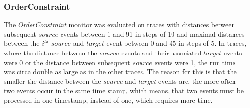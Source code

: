 \subsubsection{OrderConstraint}
The \textit{OrderConstraint} monitor was evaluated on traces with distances between subsequent $source$ events between 1 and 91 in steps of 10 and maximal distances between the $i^{th}$ $source$ and $target$ event between 0 and 45 in steps of 5. In traces, where the distance between the $source$ events and their associated $target$ events were 0 or the distance between subsequent $source$ events were 1, the run time was circa double as large as in the other traces. The reason for this is that the smaller the distance between the $source$ and $target$ events are, the more often two events occur in the same time stamp, which means, that two events must be processed in one timestamp, instead of one, which requires more time.
